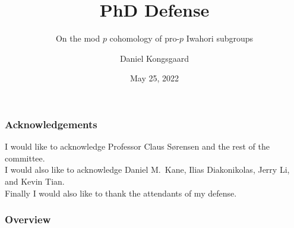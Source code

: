 \documentclass{beamer}
\title{PhD Defense} %
\subtitle{On the mod \texorpdfstring{$p$}{p} cohomology of pro-\texorpdfstring{$p$}{p} Iwahori subgroups}
\author{Daniel Kongsgaard} %
\institute{University of California, San Diego}
\date{May 25, 2022} %
\begin{document}
\begin{frame}
\titlepage %
\end{frame}

\begin{frame}
  \frametitle{Acknowledgements}

  I would like to acknowledge Professor Claus Sørensen and the rest of the committee. \\[1em]

  I would also like to acknowledge Daniel M.\ Kane, Ilias Diakonikolas, Jerry Li, and Kevin Tian. \\[1em]

  Finally I would also like to thank the attendants of my defense.
\end{frame}

\begin{frame}
\frametitle{Overview} %
\hypersetup{linkcolor=black}
\tableofcontents %
\end{frame}





\end{document}

